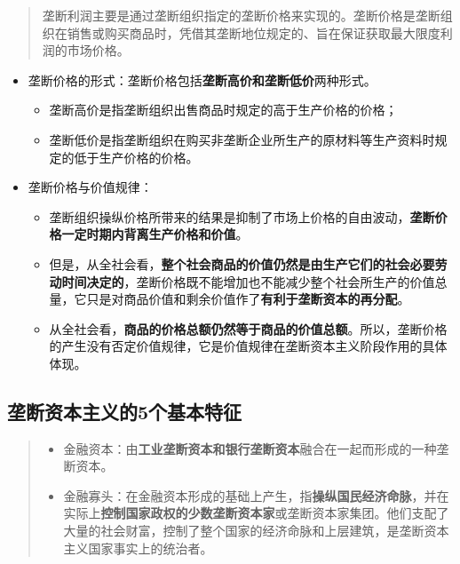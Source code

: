 \documentclass[
]{article}
\begin{document}
\begin{quote}
垄断利润主要是通过垄断组织指定的垄断价格来实现的。垄断价格是垄断组织在销售或购买商品时，凭借其垄断地位规定的、旨在保证获取最大限度利润的市场价格。
\end{quote}

\begin{itemize}
\item
  垄断价格的形式：垄断价格包括\textbf{垄断高价和垄断低价}两种形式。

  \begin{itemize}
  \item
    垄断高价是指垄断组织出售商品时规定的高于生产价格的价格；
  \item
    垄断低价是指垄断组织在购买非垄断企业所生产的原材料等生产资料时规定的低于生产价格的价格。
  \end{itemize}
\item
  垄断价格与价值规律：

  \begin{itemize}
  \item
    垄断组织操纵价格所带来的结果是抑制了市场上价格的自由波动，\textbf{垄断价格一定时期内背离生产价格和价值}。
  \item
    但是，从全社会看，\textbf{整个社会商品的价值仍然是由生产它们的社会必要劳动时间决定的}，垄断价格既不能增加也不能减少整个社会所生产的价值总量，它只是对商品价值和剩余价值作了\textbf{有利于垄断资本的再分配}。
  \item
    从全社会看，\textbf{商品的价格总额仍然等于商品的价值总额}。所以，垄断价格的产生没有否定价值规律，它是价值规律在垄断资本主义阶段作用的具体体现。
  \end{itemize}
\end{itemize}

\hypertarget{ux5784ux65adux8d44ux672cux4e3bux4e49ux76845ux4e2aux57faux672cux7279ux5f81}{%
\subsection{垄断资本主义的5个基本特征}\label{ux5784ux65adux8d44ux672cux4e3bux4e49ux76845ux4e2aux57faux672cux7279ux5f81}}

\begin{quote}
\begin{itemize}
\item
  金融资本：由\textbf{工业垄断资本和银行垄断资本}融合在一起而形成的一种垄断资本。
\item
  金融寡头：在金融资本形成的基础上产生，指\textbf{操纵国民经济命脉}，并在实际上\textbf{控制国家政权的少数垄断资本家}或垄断资本家集团。他们支配了大量的社会财富，控制了整个国家的经济命脉和上层建筑，是垄断资本主义国家事实上的统治者。
\end{itemize}
\end{quote}
\end{document}
